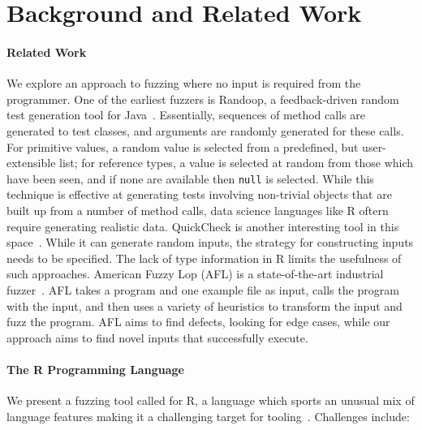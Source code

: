 \documentclass[sigplan,nonacm,anonymous,review]{acmart}
\begin{document}
\section{Background and Related Work}
\label{sec:background}

\paragraph{Related Work}
We explore an approach to fuzzing where no input is required from the
programmer. One of the earliest fuzzers is Randoop,
a feedback-driven random test generation tool for
Java~\cite{pacheco2007randoop}.  Essentially, sequences of method
calls are generated to test classes, and arguments are randomly
generated for these calls. For primitive values, a random value is
selected from a predefined, but user-extensible list; for reference
types, a value is selected at random from those which have been seen,
and if none are available then {\tt null} is selected.  While this
technique is effective at generating tests involving non-trivial
objects that are built up from a number of method calls, data science
languages like R oftern require generating realistic data.  QuickCheck
is another interesting tool in this space~\cite{quickcheck}.  While it
can generate random inputs, the strategy for constructing inputs needs
to be specified.  The lack of type information in R limits the
usefulness of such approaches. American Fuzzy Lop (AFL) is a
state-of-the-art industrial fuzzer~\cite{afl}. AFL takes a program and
one example file as input, calls the program with the input, and then
uses a variety of heuristics to transform the input and fuzz the
program.  AFL aims to find defects, looking for edge cases, while our approach
aims to find novel inputs that successfully execute.

\paragraph{The R Programming Language}

We present a fuzzing tool called \tool for R, a language which sports an unusual mix of
language features making it a challenging target for
tooling~\cite{morandat2012evaluating}.  Challenges include:
\end{document}

